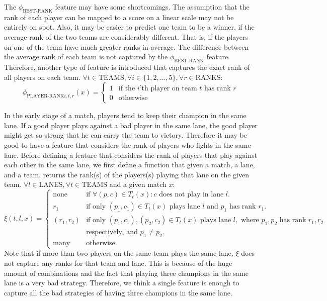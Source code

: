 The $\phi_\text{BEST-RANK}$ feature may have some shortcomings. The assumption that the rank of each player can be mapped to a score on a linear scale may not be entirely on spot.
Also, it may be easier to predict one team to be a winner, if the average rank of the two teams are considerably different. That is, if the players on one of the team have much greater ranks in average. The difference between the average rank of each team is not captured by the $\phi_\text{BEST-RANK}$ feature.
Therefore, another type of feature is introduced that captures the exact rank of all players on each team.
$\forall t \in \text{TEAMS}, \forall i \in \{1,2,\dots,5\}, \forall r \in \text{RANKS}$:
\begin{equation}\label{eq:playerrank}
\phi_{\text{PLAYER-RANK}i,t,r}(x) = 
\begin{cases} 
  1 & \text{if the } i \text{'th player on team } t \text{ has rank } r\\
  0 & \text{otherwise} 
\end{cases}  
\end{equation}

In the early stage of a match, players tend to keep their champion in the same lane.
If a good player plays against a bad player in the same lane, the good player might get so strong that he can carry the team to victory.
Therefore it may be good to have a feature that considers the rank of players who fights in the same lane.
Before defining a feature that considers the rank of players that play against each other in the same lane,
we first define a function that given a match, a lane, and a team, returns the rank(s) of the players(s) playing that lane on the given team.
$\forall l \in \text{LANES}, \forall t \in \text{TEAMS}$ and a given match $x$:
\begin{equation}\label{eq:xi}
  \xi(t,l,x) =
\begin{cases} 
  \text{none} & \text{if } \forall(p,c) \in T_t(x): c \text{ does not play in lane } l. \\
  r_1 & \text{if only } (p_1, c_1) \in T_t(x) \text{ plays lane } l \text{ and } p_1 \text{ has rank } r_1 \text{.}\\
  (r_1, r_2) & \text{if only } (p_1, c_1), (p_2, c_2) \in T_t(x) \text{ plays lane } l, \text{ where } p_1, p_2 \text{ has rank } r_1, r_2\\ 
&\text{respectively, and } p_1 \neq p_2.\\
  \text{many} & \text{otherwise}.
\end{cases}
\end{equation}
Note that if more than two players on the same team plays the same lane, $\xi$ does not capture any ranks for that team and lane. This is because of the huge amount of combinations and the fact that playing three champions in the same lane is a very bad strategy. Therefore, we think a single feature is enough to capture all the bad strategies of having three champions in the same lane.
 
